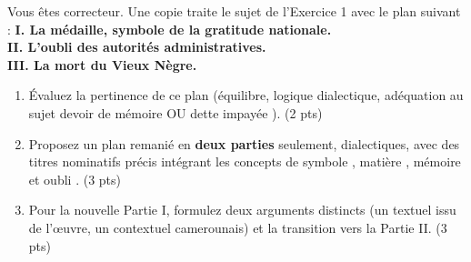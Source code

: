 \documentclass[11pt]{article}
\begin{document}
\begin{exercice}
Vous êtes correcteur. Une copie traite le sujet de l'Exercice 1 avec le plan suivant :
\textbf{I. La médaille, symbole de la gratitude nationale.} \\
\textbf{II. L'oubli des autorités administratives.} \\
\textbf{III. La mort du Vieux Nègre.}
\begin{enumerate}
    \item Évaluez la pertinence de ce plan (équilibre, logique dialectique, adéquation au sujet \og devoir de mémoire OU dette impayée \fg{}). (2 pts)
    \item Proposez un plan remanié en \textbf{deux parties} seulement, dialectiques, avec des titres nominatifs précis intégrant les concepts de \og symbole \fg{}, \og matière \fg{}, \og mémoire \fg{} et \og oubli \fg{}. (3 pts)
    \item Pour la nouvelle Partie I, formulez deux arguments distincts (un textuel issu de l'œuvre, un contextuel camerounais) et la transition vers la Partie II. (3 pts)
\end{enumerate}
\end{exercice}
\end{document}
